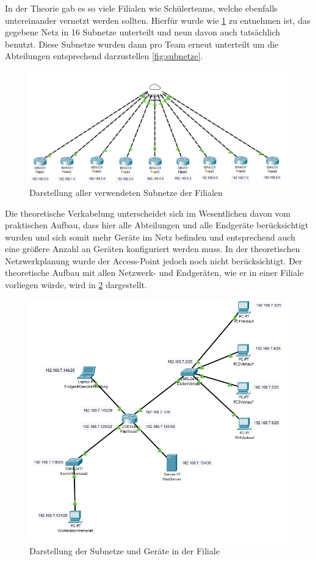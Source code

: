 In der Theorie gab es so viele Filialen wie Schülerteams, welche ebenfalls untereinander vernetzt werden sollten. Hierfür wurde wie \ref{fig:netzplan_gesamt} zu entnehmen ist, das gegebene Netz in
16 Subnetze unterteilt und neun davon auch tatsächlich benutzt. Diese Subnetze wurden dann pro Team erneut unterteilt um die Abteilungen entsprechend darzustellen \ref{fig:subnetze}. 

\begin{figure}[h]
	\centering
	\includegraphics[width=15cm]{images/Netzplan_gesamt.png}
	\caption[Netzplan gesamt]{Darstellung aller verwendeten Subnetze der Filialen}
	\label{fig:netzplan_gesamt}
\end{figure}

Die theoretische Verkabelung unterscheidet sich im Wesentlichen davon vom praktischen Aufbau, dass hier alle Abteilungen und alle Endgeräte berücksichtigt wurden und sich somit
mehr Geräte im Netz befinden und entsprechend auch eine größere Anzahl an Geräten konfiguriert werden muss. In der theoretischen Netzwerkplanung wurde der Access-Point jedoch noch nicht 
berücksichtigt. Der theoretische Aufbau mit allen Netzwerk- und Endgeräten, wie er in einer Filiale vorliegen würde, wird in \ref{fig:netzplan_filiale} dargestellt.

\begin{figure}[h]
	\centering
	\includegraphics[width=15cm]{images/Netzplan_Filiale.png}
	\caption[Netzplan Filiale]{Darstellung der Subnetze und Geräte in der Filiale}
	\label{fig:netzplan_filiale}
\end{figure}